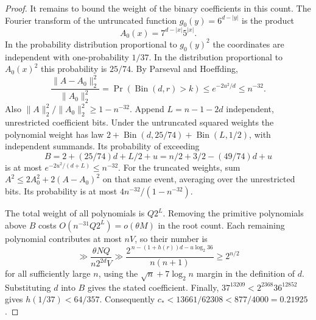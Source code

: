 \documentclass[11pt]{article}
\begin{document}
\begin{proof}
It remains to bound the weight of the binary coefficients in this
count. The Fourier transform of the untruncated function
\(g_0(y)=6^{d-|y|}\) is the product
\[
 A_0(x)=7^{d-|x|}5^{|x|}.
\]
In the probability distribution proportional to \(g_0(y)^2\) the
coordinates are independent with one-probability \(1/37\).
In the distribution proportional to \(A_0(x)^2\) this probability is
\(25/74\). By Parseval and Hoeffding,
\[
 \frac{\|A-A_0\|_2^2}{\|A_0\|_2^2}
 =\Pr(\operatorname{Bin}(d,r)>k)
 \le e^{-2u^2/d}\le n^{-32}.
\]
Also \(\|A\|_2^2/\|A_0\|_2^2\ge1-n^{-32}\).
Append \(L=n-1-2d\) independent, unrestricted coefficient bits.
Under the untruncated squared weights the polynomial weight has law
\(2+\operatorname{Bin}(d,25/74)+\operatorname{Bin}(L,1/2)\), with
independent summands. Its probability of exceeding
\[
 B=2+(25/74)d+L/2+u=n/2+3/2-(49/74)d+u
\]
is at most \(e^{-2u^2/(d+L)}\le n^{-32}\). For the truncated
weights, sum \(A^2\le2A_0^2+2(A-A_0)^2\) on that same event,
averaging over the unrestricted bits. Its probability is at most
\(4n^{-32}/(1-n^{-32})\).

The total weight of all polynomials is \(Q2^L\). Removing the
primitive polynomials above \(B\) costs \(O(n^{-31}Q2^L)=o(\theta M)\)
in the root count. Each remaining polynomial contributes at most
\(nV\), so their number is
\[
 \gg\frac{\theta NQ}{n2^{2d}V}
 \gg\frac{2^{\,n-(1+h(r))d-u\log_2 36}}{n(n+1)}
 \ge 2^{n/2}
\]
for all sufficiently large \(n\), using the \(\sqrt n+7\log_2 n\)
margin in the definition of \(d\). Substituting \(d\) into \(B\)
gives the stated coefficient.
Finally, \(37^{13209}<2^{2368}36^{12852}\) gives
\(h(1/37)<64/357\). Consequently
\(c_*<13661/62308<877/4000=0.21925\).
\end{proof}
\end{document}
